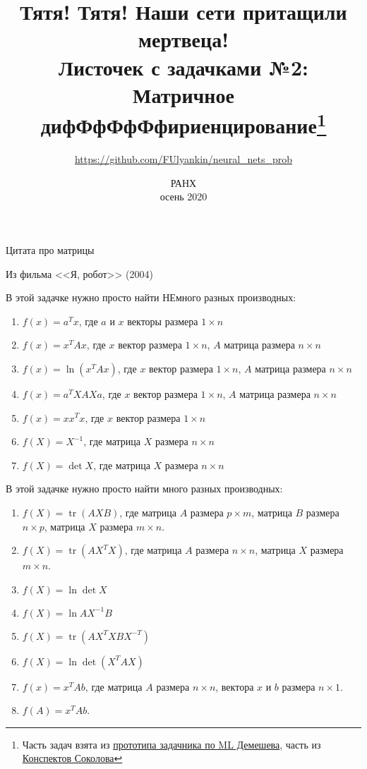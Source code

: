 \documentclass[12pt, a4paper, oneside]{article}
\title{%
	Тятя! Тятя! Наши сети притащили мертвеца! \\
	\large Листочек с задачками №2: Матричное дифФфФфФфириенцирование\footnote{Часть задач взята из \href{https://github.com/bdemeshev/mlearn_pro/blob/master/mlearn_pro.pdf}{прототипа задачника по ML Демешева}, часть из \href{https://github.com/esokolov/ml-course-msu}{Конспектов Соколова}}
}
\date{РАНХ \\ осень 2020}
\author{\url{https://github.com/FUlyankin/neural_nets_prob} }
\theoremstyle{plain} %
\theoremstyle{definition}
\DeclareMathOperator{\tr}{tr}
\begin{document}
	
	\maketitle
	
\epigraph{Цитата про матрицы}{Из фильма <<Я, робот>> (2004)}

\begin{problem}{}	
	В этой задачке нужно  просто найти НЕмного разных производных: 
	\begin{enumerate}	
		
		\item $f(x) = a^T x$, где  $a$  и $x$ векторы размера $1 \times n$ 
		
		\item $f(x) = x^T A x$, где $x$ вектор размера $1 \times n$, $A$ матрица размера $n \times n$
		
		\item $f(x) = \ln(x^T A x)$, где $x$ вектор размера $1 \times n$, $A$ матрица размера $n \times n$
		
		\item $f(x) = a^TXAXa$, где $x$ вектор размера $1 \times n$, $A$ матрица размера $n \times n$
		
		\item $f(x) = x x^T x$,  где $x$ вектор размера $1 \times n$
		
		\item $f(X) = X^{-1}$, где матрица $X$ размера $n \times n$
		
		\item  $f(X) = \det X$, где матрица $X$ размера $n \times n$
	\end{enumerate}
\end{problem} 


\begin{problem}{}
	В этой задачке нужно  просто найти много разных производных: 
	\begin{enumerate}
		
		
		\item $f(X) = \tr(AXB)$, где матрица $A$ размера $p \times m$, матрица $B$ размера $n \times p$, матрица $X$ размера $m \times n$. 
		
		\item $f(X) = \tr(AX^TX)$, где матрица $A$ размера $n \times n$, матрица $X$ размера $m \times n$. 
		
		\item $f(X) = \ln \det X$
		
		\item $f(X) = \ln AX^{-1}B$  %
		
		\item $f(X) = \tr(AX^TXBX^{-T})$
		
		\item $f(X) = \ln \det(X^TAX)$
		
		\item $f(x) = x^TAb$, где матрица $A$ размера $n \times n$, вектора $x$ и $b$ размера $n \times 1$. 
		
		\item $f(A) = x^TAb$. 
	\end{enumerate}
\end{problem}
\end{document}
